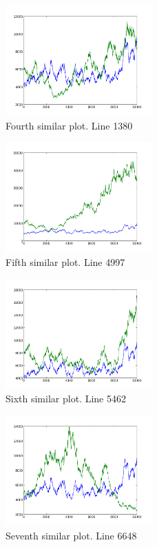 \begin{figure}[h!]
    \centering
    \includegraphics[width=0.5\textwidth]{images/1380.png}
    \caption{Fourth similar plot.  Line 1380}
    \label{fig:ex1_4}
\end{figure}

\begin{figure}[h!]
    \centering
    \includegraphics[width=0.5\textwidth]{images/4997.png}
    \caption{Fifth similar plot.  Line 4997}
    \label{fig:ex1_5}
\end{figure}

\begin{figure}[h!]
    \centering
    \includegraphics[width=0.5\textwidth]{images/5462.png}
    \caption{Sixth similar plot.  Line 5462}
    \label{fig:ex1_6}
\end{figure}

\begin{figure}[h!]
    \centering
    \includegraphics[width=0.5\textwidth]{images/6648.png}
    \caption{Seventh similar plot.  Line 6648}
    \label{fig:ex1_7}
\end{figure}

